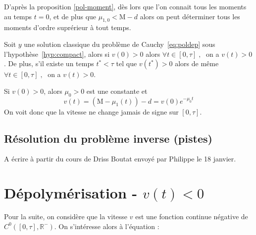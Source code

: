 \documentclass[a4paper]{article}
\newcommand{\mass}{\mathrm{M}}
\newcommand{\dep}{d}
\begin{document}
D'après la proposition \ref{pol-moment}, 
dès lors que l'on connait tous les moments au temps $t=0$, 
et de plus que $\mu_{1,0}<\mass-\dep$
alors on peut déterminer tous les moments d'ordre suprérieur à tout temps.

\begin{proposition}
	\label{prop:vp}
	Soit $y$ une solution classique du problème de Cauchy~\eqref{eq:poldep} sous l'hypothèse~\eqref{hyp:compact}, alors si $v(0) >0 $ alors $\forall t \in [0,\tau] \;, \;$ on a $v(t) >0$ . De plus, s'il existe un temps $t^*<\tau$ tel que $v(t^*) >0$ alors de même $\forall t \in [0,\tau] \;, \;$ on a $v(t) >0$.
\end{proposition}

\begin{preuve}
	Si $v(0)>0$, alors $\mu_0>0$ est une constante et 
	\[ v(t) = ( \mass - \mu_1 (t)) - \dep = v(0)e^{- \mu_0 t} \]
	On voit donc que la vitesse ne change jamais de signe sur $[0,\tau]$.
\end{preuve}


\subsection{Résolution du problème inverse (pistes)}

A écrire à partir du cours de Driss Boutat envoyé par Philippe le 18 janvier.


\section{Dépolymérisation - $v(t) < 0$}

Pour la suite, on considère que la vitesse $v$ est une fonction continue négative de $C^0([0,\tau],\mathbb{R}^-)$.
On s'intéresse alors à l'équation :
\end{document}
